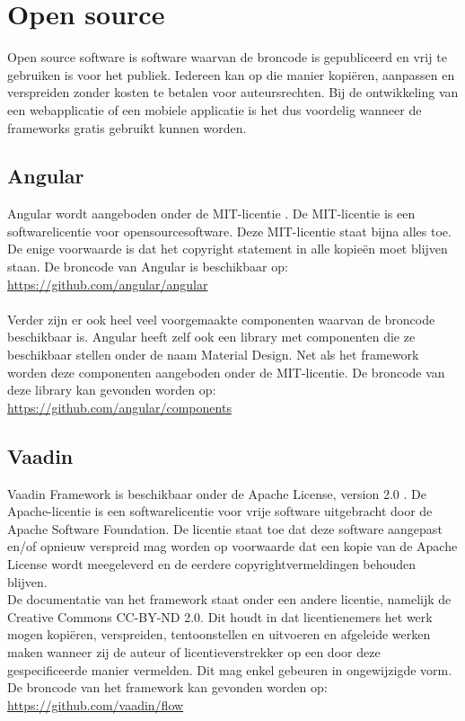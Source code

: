 \section{Open source}
Open source software is software waarvan de broncode is gepubliceerd en vrij te gebruiken is voor het publiek. Iedereen kan op die manier kopiëren, aanpassen en verspreiden zonder kosten te betalen voor auteursrechten.
Bij de ontwikkeling van een webapplicatie of een mobiele applicatie is het dus voordelig wanneer de frameworks gratis gebruikt kunnen worden. 

\subsection{Angular} \label{Open source Angular}
Angular wordt aangeboden onder de MIT-licentie \autocite{MIT2019}.
De MIT-licentie is een softwarelicentie voor opensourcesoftware. Deze MIT-licentie staat bijna alles toe. De enige voorwaarde is dat het copyright statement in alle kopieën moet blijven staan.
De broncode van Angular is beschikbaar op: 
\\
\url{https://github.com/angular/angular} \\ \\
Verder zijn er ook heel veel voorgemaakte componenten waarvan de broncode beschikbaar is. Angular heeft zelf ook een library met componenten die ze beschikbaar stellen onder de naam Material Design. Net als het framework worden deze componenten aangeboden onder de MIT-licentie. De broncode van deze library kan gevonden worden op:
\\
\url{https://github.com/angular/components}

\subsection{Vaadin} \label{Open source Vaadin}
Vaadin Framework is beschikbaar onder de Apache License, version 2.0 \autocite{Apache2019}.
De Apache-licentie is een softwarelicentie voor vrije software uitgebracht door de Apache Software Foundation. De licentie staat toe dat deze software aangepast en/of opnieuw verspreid mag worden op voorwaarde dat een kopie van de Apache License wordt meegeleverd en de eerdere copyrightvermeldingen behouden blijven.
\\ De documentatie van het framework staat onder een andere licentie, namelijk de Creative Commons CC-BY-ND 2.0. Dit houdt in dat licentienemers  het werk mogen  kopiëren, verspreiden, tentoonstellen en uitvoeren en afgeleide werken maken wanneer zij de auteur of licentieverstrekker op een door deze gespecificeerde manier vermelden. Dit mag enkel gebeuren in ongewijzigde vorm.
\\De broncode van het framework kan gevonden worden op: 
\\ \url{https://github.com/vaadin/flow} \\ \\

